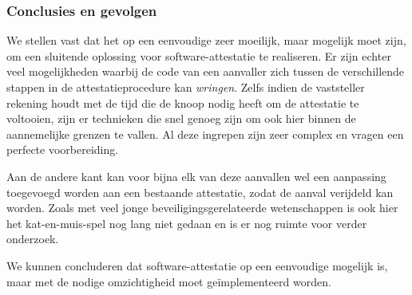 \subsubsection*{Conclusies en gevolgen}

We stellen vast dat het op een eenvoudige \mcu zeer moeilijk, maar mogelijk
moet zijn, om een sluitende oplossing voor software-attestatie te realiseren.
Er zijn echter veel mogelijkheden waarbij de code van een aanvaller zich tussen
de verschillende stappen in de attestatieprocedure kan \emph{wringen}. Zelfs
indien de vaststeller rekening houdt met de tijd die de knoop nodig heeft om de
attestatie te voltooien, zijn er technieken die snel genoeg zijn om ook hier
binnen de aannemelijke grenzen te vallen. Al deze ingrepen zijn zeer complex en
vragen een perfecte voorbereiding.

Aan de andere kant kan voor bijna elk van deze aanvallen wel een aanpassing
toegevoegd worden aan een bestaande attestatie, zodat de aanval verijdeld kan
worden. Zoals met veel jonge beveiligingsgerelateerde wetenschappen is ook hier
het kat-en-muis-spel nog lang niet gedaan en is er nog ruimte voor verder
onderzoek.

We kunnen concluderen dat software-attestatie op een eenvoudige \mcu mogelijk
is, maar met de nodige omzichtigheid moet ge\"implementeerd worden.
